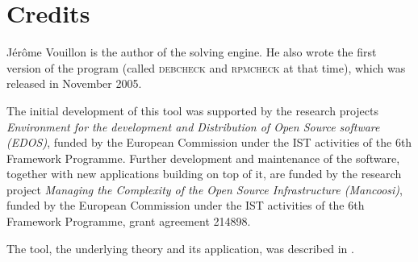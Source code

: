 
\section{Credits}
\label{sec:credits}

Jérôme Vouillon is the author of the solving engine. He also wrote the
first version of the program (called \textsc{debcheck} and
\textsc{rpmcheck} at that time), which was released in November 2005.

The initial development of this tool was supported by the research
projects \emph{Environment for the development and Distribution of
  Open Source software (EDOS)}, funded by the European Commission
under the IST activities of the 6th Framework Programme. Further
development and maintenance of the software, together with new
applications building on top of it, are funded by the research project
\emph{Managing the Complexity of the Open Source Infrastructure
  (Mancoosi)}, funded by the European Commission under the IST
activities of the 6th Framework Programme, grant agreement 214898.

The tool, the underlying theory and its application, was described in
\cite{edos2006ase}.

